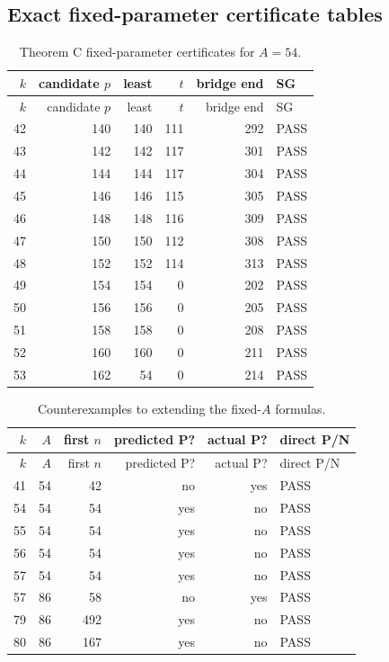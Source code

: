 \documentclass[11pt]{article}
\theoremstyle{remark}
\begin{document}
\subsection{Exact fixed-parameter certificate tables}
\begin{longtable}{rrrrrl}
\caption{Theorem C fixed-parameter certificates for $A=54$.}\label{tab:Ccert}\\
\toprule $k$ & candidate $p$ & least & $t$ & bridge end & SG \\
\midrule\endfirsthead\toprule $k$ & candidate $p$ & least & $t$ & bridge end & SG \\
\midrule\endhead
42 & 140 & 140 & 111 & 292 & PASS \\
43 & 142 & 142 & 117 & 301 & PASS \\
44 & 144 & 144 & 117 & 304 & PASS \\
45 & 146 & 146 & 115 & 305 & PASS \\
46 & 148 & 148 & 116 & 309 & PASS \\
47 & 150 & 150 & 112 & 308 & PASS \\
48 & 152 & 152 & 114 & 313 & PASS \\
49 & 154 & 154 & 0 & 202 & PASS \\
50 & 156 & 156 & 0 & 205 & PASS \\
51 & 158 & 158 & 0 & 208 & PASS \\
52 & 160 & 160 & 0 & 211 & PASS \\
53 & 162 & 54 & 0 & 214 & PASS \\
\bottomrule\end{longtable}

\begin{longtable}{rrrrrl}
\caption{Counterexamples to extending the fixed-$A$ formulas.}\label{tab:Cfail}\\
\toprule $k$ & $A$ & first $n$ & predicted P? & actual P? & direct P/N \\
\midrule\endfirsthead\toprule $k$ & $A$ & first $n$ & predicted P? & actual P? & direct P/N \\
\midrule\endhead
41 & 54 & 42 & no & yes & PASS \\
54 & 54 & 54 & yes & no & PASS \\
55 & 54 & 54 & yes & no & PASS \\
56 & 54 & 54 & yes & no & PASS \\
57 & 54 & 54 & yes & no & PASS \\
57 & 86 & 58 & no & yes & PASS \\
79 & 86 & 492 & yes & no & PASS \\
80 & 86 & 167 & yes & no & PASS \\
\bottomrule\end{longtable}
\end{document}
